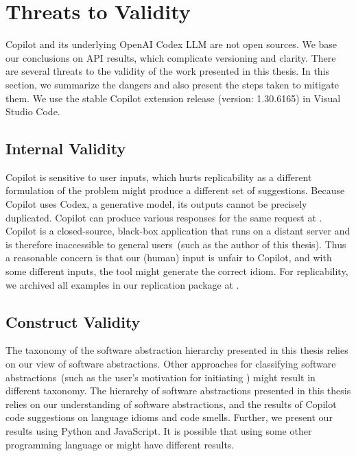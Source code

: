 \section{Threats to Validity}
\label{limitations}
Copilot and its underlying OpenAI Codex LLM are not open sources. 
We base our conclusions on API results, which complicate versioning and clarity. There are several threats to the validity of the work presented in this thesis. In this section, we summarize the dangers and also present the steps taken to mitigate them. We use the stable Copilot extension release (version: 1.30.6165) in Visual Studio Code. %

\subsection{Internal Validity}
Copilot is sensitive to user inputs, which hurts replicability as a different formulation of the problem might produce a different set of suggestions. 
Because Copilot uses Codex, a generative model, its outputs cannot be precisely duplicated. Copilot can produce various responses for the same request at . Copilot is a closed-source, black-box application that runs on a distant server and is therefore inaccessible to general users~(such as the author of this thesis).
Thus a reasonable concern is that our (human) input is unfair to Copilot, and with some different inputs, the tool might generate the correct idiom. 
For replicability, we archived all examples in our replication package at \repl{}.

\subsection{Construct Validity}
The taxonomy of the software abstraction hierarchy presented in this thesis relies on our view of software abstractions.
Other approaches for classifying software abstractions~(such as the user's motivation for initiating \cct{}) might result in different taxonomy.
The hierarchy of software abstractions presented in this thesis relies on our understanding of software abstractions, and the results of Copilot code suggestions on language idioms and code smells. Further, we present our results using Python and JavaScript. It is possible that using some other programming language or \cct{} might have different results.

